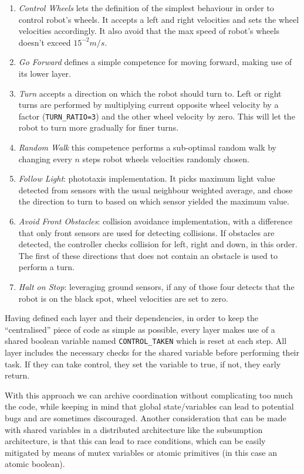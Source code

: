 \begin{enumerate}
    \item \emph{Control Wheels} lets the definition of the simplest behaviour
        in order to control robot's wheels. It accepts a left and right
        velocities and sets the wheel velocities accordingly. It also avoid
        that the max speed of robot's wheels doesn't exceed $15^{-2}m/s$.
    \item \emph{Go Forward} defines a simple competence for moving forward,
        making use of its lower layer.
    \item \emph{Turn} accepts a direction on which the robot should turn to.
        Left or right turns are performed by multiplying current opposite wheel
        velocity by a factor (\texttt{TURN\_RATIO=3}) and the other wheel velocity by zero.
        This will let the robot to turn more gradually for finer turns.
    \item \emph{Random Walk} this competence performs a sub-optimal random walk by changing
        every $n$ steps robot wheels velocities randomly chosen.
    \item \emph{Follow Light}: phototaxis implementation. It picks maximum
        light value detected from sensors with the usual neighbour weighted
        average, and chose the direction to turn to based on which sensor
        yielded the maximum value.
    \item \emph{Avoid Front Obstacles}: collision avoidance implementation,
        with a difference that only front sensors are used for detecting
        collisions. If obstacles are detected, the controller checks collision
        for left, right and down, in this order. The first of these directions
        that does not contain an obstacle is used to perform a turn.
    \item \emph{Halt on Stop}: leveraging ground sensors, if any of those four
        detects that the robot is on the black spot, wheel velocities are set
        to zero.
\end{enumerate}
Having defined each layer and their dependencies, in order to keep the
``centralised'' piece of code as simple as possible, every layer makes use of a
shared boolean variable named \texttt{CONTROL\_TAKEN} which is reset at each
step. All layer includes the necessary checks for the shared variable before
performing their task. If they can take control, they set the variable to true,
if not, they early return.

With this approach we can archive coordination without complicating too much
the code, while keeping in mind that global state/variables can lead to
potential bugs and are sometimes discouraged. Another consideration that can be
made with shared variables in a distributed architecture like the subsumption
architecture, is that this can lead to race conditions, which can be easily
mitigated by means of mutex variables or atomic primitives (in this case an
atomic boolean).

